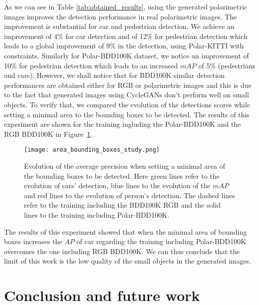 As we can see in Table \ref{tab:obtained_results}, using the generated polarimetric images improves the detection performance in real polarimetric images. The improvement is substantial for car and pedestrian detection. We achieve an improvement of 4\% for car detection and of 12\% for pedestrian detection which leads to a global improvement of 9\% in the detection, using Polar-KITTI with constraints. Similarly for Polar-BDD100K dataset, we notice an improvement of 10\% for pedestrian detection which leads to an increased $mAP$ of 5\% (pedestrians and cars). However, we shall notice that for BDD100K similar detection performances are obtained either for RGB or polarimetric images and this is due to the fact that generated images using CycleGANs don't perform well on small objects. To verify that, we compared the evolution of the detections scores while setting a minimal area to the bounding boxes to be detected. The results of this experiment are shown for the training ingluding the Polar-BDD100K and the RGB BDD100K in Figure~\ref{fig:bounding_boxes}.

\begin{figure}
	\centering
	\texttt{[image: area\_bounding\_boxes\_study.png]}
	\caption{Evolution of the average precision when setting a minimal area of the bounding boxes to be detected. Here green lines refer to the evolution of cars' detection, blue lines to the evolution of the $mAP$ and red lines to the evolution of person's detection. The dashed lines refer to the training including the BDD100K RGB and the solid lines to the training including Polar-BDD100K.}
	\label{fig:bounding_boxes}
\end{figure}

The results of this experiment showed that when the minimal area of bounding boxes increases the $AP$ of car regarding the training including Polar-BDD100K overcomes the one including RGB BDD100K. We can thus conclude that the limit of this work is the low quality of the small objects in the generated images. 

\section{Conclusion and future work}

